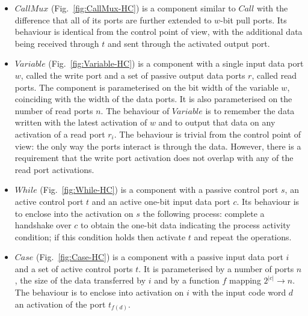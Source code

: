 \begin{itemize}
\item
$CallMux$ (Fig.~\ref{fig:CallMux-HC}) is a component similar to $Call$ with the difference that all of its ports are further extended to $w$-bit pull ports.
Its behaviour is identical from the control point of view, with the additional data being received through $t$ and sent through the activated output port.

\item
$Variable$ (Fig.~\ref{fig:Variable-HC}) is a component with a single input data port $w$, called the write port and a set of passive output data ports $r$, called read ports. 
The component is parameterised on the bit width of the variable $w$, coinciding with the width of the data ports. It is also parameterised on the number of read ports $n$. 
The behaviour  of $Variable$ is to remember the data written with the latest activation of $w$ and to output that data on any activation of a read port $r_i$.
The behaviour is trivial from the control point of view: the only way the ports interact is through the data. However, there is a requirement that the write port activation does not overlap with any of the read port activations.

\item
$While$ (Fig.~\ref{fig:While-HC}) is a component with a passive control port $s$, an active control port $t$ and an active one-bit input data port $c$. Its behaviour is to enclose into the activation on $s$ the following process:
complete a handshake over $c$ to obtain the one-bit data indicating the process activity condition; if this condition holds then activate $t$ and repeat the operations.

\item
$Case$ (Fig.~\ref{fig:Case-HC}) is a component with a passive input data port $i$ and a set of active control ports $t$. It is parameterised by a number of ports $n$, 
the size of the data transferred by $i$ and by a function $f$ mapping $2^{|c|}\rightarrow n$.
The behaviour is to enclose into activation on $i$ with the input code word $d$ an activation of the port $t_{f(d)}$.

\end{itemize}



